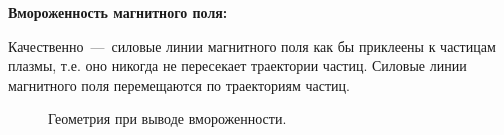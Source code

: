 \documentclass[10pt, a4paper]{article}
\numberwithin{equation}{section}
\begin{document}
\textbf{Вмороженность магнитного поля:}

Качественно~---~силовые линии магнитного поля как бы приклеены к частицам плазмы, т.е. оно никогда не пересекает траектории частиц.  Силовые линии магнитного поля перемещаются по траекториям частиц.

\begin{figure}[h!]
    \caption{\label{fig.5.flow} Геометрия при выводе вмороженности.}
\end{figure}
\end{document}
